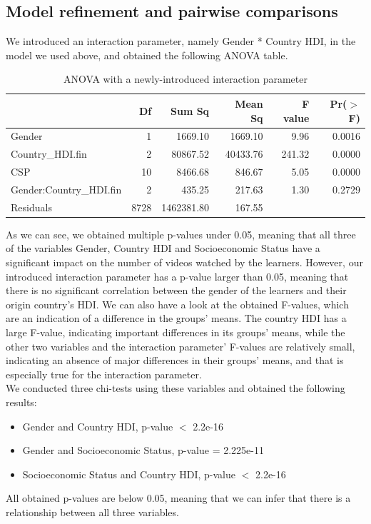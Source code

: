 \documentclass[12pt]{article}
\begin{document}
\subsection{Model refinement and pairwise comparisons}

We introduced an interaction parameter, namely Gender * Country HDI, in the model we used above, and obtained the following ANOVA table.

\begin{table}[ht]
\centering
\begin{tabular}{lrrrrr}
  \hline
 & Df & Sum Sq & Mean Sq & F value & Pr($>$F) \\ 
  \hline
Gender & 1 & 1669.10 & 1669.10 & 9.96 & 0.0016 \\ 
  Country\_HDI.fin & 2 & 80867.52 & 40433.76 & 241.32 & 0.0000 \\ 
  CSP & 10 & 8466.68 & 846.67 & 5.05 & 0.0000 \\ 
  Gender:Country\_HDI.fin & 2 & 435.25 & 217.63 & 1.30 & 0.2729 \\ 
  Residuals & 8728 & 1462381.80 & 167.55 &  &  \\ 
   \hline
\end{tabular}
\caption{ANOVA with a newly-introduced interaction parameter}
\end{table}

As we can see, we obtained multiple p-values under 0.05, meaning that all three of the variables Gender, Country HDI and Socioeconomic Status have a significant impact on the number of videos watched by the learners. However, our introduced interaction parameter has a p-value larger than 0.05, meaning that there is no significant correlation between the gender of the learners and their origin country's HDI. We can also have a look at the obtained F-values, which are an indication of a difference in the groups' means. The country HDI has a large F-value, indicating important differences in its groups' means, while the other two variables and the interaction parameter' F-values are relatively small, indicating an absence of major differences in their groups' means, and that is especially true for the interaction parameter. \\

We conducted three chi-tests using these variables and obtained the following results:
\begin{itemize}
    \item Gender and Country HDI, p-value $<$ 2.2e-16
    \item Gender and Socioeconomic Status, p-value = 2.225e-11
    \item Socioeconomic Status and Country HDI, p-value $<$ 2.2e-16
\end{itemize}
All obtained p-values are below 0.05, meaning that we can infer that there is a relationship between all three variables. \\
\end{document}
